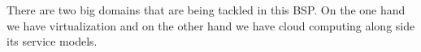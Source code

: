 There are two big domains that are being tackled in this BSP. On the
one hand we have virtualization and on the other hand we have cloud
computing along side its service models. 

